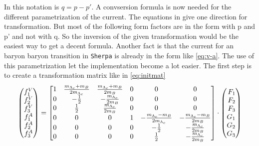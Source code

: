 In this notation is \(q = p - p'\). A convsersion formula is now needed for the 
different parametrization of the current. The equations in 
{\cite[Eq. 15]{form_factor_conversion}} give one direction for transformation. 
But most of the following form factors are in the form with p and p' and not 
with q. So the inversion of the given transformation would be the easiest 
way to get a decent formula. Another fact is that the current for an baryon 
baryon transition in \texttt{Sherpa} is already in the form like {\eqref{eq:v-a}}. 
The use of this parametrization let the implementation become a lot easier. 
The first step is to create a transformation matrix like in {\eqref{eq:initmat}}
\begin{equation}
  \Spvek{f^V_1; f^V_2; f^V_3; f^A_1; f^A_2; f^A_3} =
  \begin{bmatrix}
    1 & \frac{m_{\Lambda_c} + m_B }{2 m_{\Lambda_c}} & \frac{m_{\Lambda_c} + m_B }{2 m_B} & 0 & 0 & 0 \\
    0 & -\frac{1}{2} & -\frac{m_{\Lambda_c}}{2 m_B} & 0 & 0 & 0 \\
    0 & \frac{1}{2} & \frac{m_{\Lambda_c}}{2 m_B} & 0 & 0 & 0 \\
    0 & 0 & 0 & 1 & -\frac{m_{\Lambda_c} - m_B }{2 m_{\Lambda_c}} & - \frac{m_{\Lambda_c} - m_B }{2 m_B} \\
    0 & 0 & 0 & 0 & -\frac{1}{2} & -\frac{m_{\Lambda_c}}{2 m_B} \\
    0 & 0 & 0 & 0 & \frac{1}{2} & -\frac{m_{\Lambda_c}}{2 m_B}
  \end{bmatrix}
  \cdot \Spvek{F_1; F_2; F_3; G_1; G_2; G_3} \label{eq:initmat}
\end{equation}
